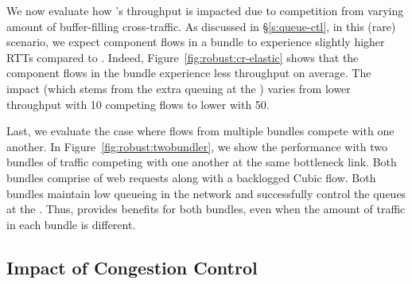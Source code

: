 
We now evaluate how \name's throughput is impacted due to competition from varying amount of buffer-filling cross-traffic. 
As discussed in \S\ref{s:queue-ctl}, in this (rare) scenario, we expect component flows in a bundle to experience slightly higher RTTs compared to \baseline.
Indeed, Figure~\ref{fig:robust:cr-elastic} shows that 
the component flows in the bundle experience  \bundlerElasticTputWorseness less throughput on average. The impact (which stems from the extra queuing at the \inbox) varies from \bundlerElasticTputWorsenessTen lower throughput with 10 competing flows to \bundlerElasticTputWorsenessFifty lower with 50. 


 Last, we evaluate the case where flows from multiple bundles compete with one another. 
In Figure~\ref{fig:robust:twobundler}, we show the performance with two bundles of traffic competing with one another at the same bottleneck link. 
Both bundles comprise of web requests along with a backlogged Cubic flow. 
Both bundles maintain low queueing in the network and successfully control the queues at the \inbox.
Thus, \name provides benefits for both bundles, even when the amount of traffic in each bundle is different.  

\subsection{Impact of Congestion Control}\label{s:eval:cc}

